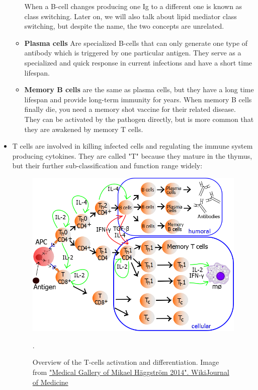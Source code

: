 \begin{itemize}
\begin{itemize}
\begin{itemize}
                \end{itemize}
    
            When a B-cell changes producing one Ig to a different one is known as class switching. Later on, we will also talk about lipid mediator class switching, but despite the name, the two concepts are unrelated.
    
            \item{\textbf{Plasma cells}} Are specialized B-cells that can only generate one type of antibody which is triggered by one particular antigen. They serve as a specialized and quick response in current infections and have a short time lifespan.
        
            \item{\textbf{Memory B cells}} are the same as plasma cells, but they have a long time lifespan and provide long-term immunity for years. When memory B cells finally die, you need a memory shot vaccine for their related disease. They can be activated by the pathogen directly, but is more common that they are awakened by memory T cells.        

        \end{itemize}


        \item {T cells} are involved in killing infected cells and regulating the immune system producing cytokines. They are called "T" because they mature in the thymus, but their further sub-classification and function range widely:

        \begin{figure}[ht]
            \centering
                \includegraphics[width=0.5\linewidth]{figures/Inflammation/Lymphocyte_activation.png} 
            \caption{Overview of the T-cells activation and differentiation. Image from \href{https://en.wikiversity.org/wiki/WikiJournal_of_Medicine/Medical_gallery_of_Mikael_H\%C3\%A4ggstr\%C3\%B6m_2014}{"Medical Gallery of Mikael Häggström 2014". WikiJournal of Medicine}}.
            \label{figure:Thell}
        \end{figure}  
    

\end{itemize}
